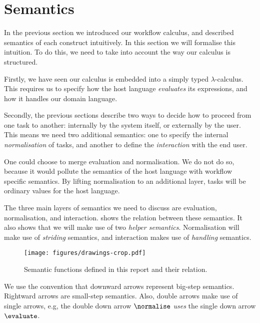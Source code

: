 


\section{Semantics}
\label{sec:semantics}

In the previous section we introduced our workflow calculus,
and described semantics of each construct intuitively.
In this section we will formalise this intuition.
To do this,
we need to take into account the way our calculus is structured.

Firstly,
we have seen our calculus is embedded into a simply typed $\lambda$-calculus.
This requires us to specify how the host language \emph{evaluates} its expressions,
and how it handles our domain language.

Secondly,
the previous sections describe two ways to decide how to proceed from one task to another:
internally by the system itself, or externally by the user.
This means we need two additional semantics:
one to specify the internal \emph{normalisation} of tasks,
and another to define the \emph{interaction} with the end user.

One could choose to merge evaluation and normalisation.
We do not do so,
because it would pollute the semantics of the host language with workflow specific semantics.
By lifting normalisation to an additional layer,
tasks will be ordinary values for the host language.

The three main layers of semantics we need to discuss are evaluation, normalisation, and interaction.
 shows the relation between these semantics.
It also shows that we will make use of two \emph{helper semantics}.
Normalisation will make use of \emph{striding} semantics,
and interaction makes use of \emph{handling} semantics.

\begin{figure}[h]
  \centering
  \texttt{[image: figures/drawings-crop.pdf]}
  \caption{
    Semantic functions defined in this report and their relation.
  }
  \label{fig:semantic-functions}
\end{figure}

We use the convention that downward arrows represent big-step semantics.
Rightward arrows are small-step semantics.
Also, double arrows make use of single arrows,
e.g, the double down arrow $\normalise$ \emph{uses} the single down arrow $\evaluate$.



